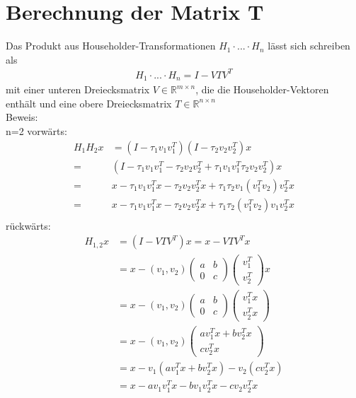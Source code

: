 \section{Berechnung der Matrix T}
Das Produkt aus Householder-Transformationen $H_1 \cdot ... \cdot H_n$ lässt sich schreiben als 
\begin{align*}
	H_1 \cdot ... \cdot H_n = I - VTV^T
\end{align*}
mit einer unteren Dreiecksmatrix $V \in \mathbb{R}^{m \times n}$, die die Householder-Vektoren enthält und eine obere Dreiecksmatrix $T \in \mathbb{R}^{n \times n}$ \cite{Joffrain:2006:AHT:1141885.1141886}\\
Beweis:\\
n=2
vorwärts: 
\begin{align*}
	H_1 H_2 x &= (I-\tau_1 v_1 v_1^T)(I-\tau_2 v_2 v_2^T)x\\
	= &(I - \tau_1 v_1 v_1^T - \tau_2 v_2 v_2^T +  \tau_1 v_1 v_1^T \tau_2 v_2 v_2^T )x\\
  = &x - \tau_1 v_1 v_1^T x - \tau_2 v_2 v_2^T x + \tau_1 \tau_2 v_1 (v_1^T v_2 )v_2^T x\\
  = &x - \tau_1 v_1 v_1^T x - \tau_2 v_2 v_2^T x + \tau_1 \tau_2 (v_1^T v_2 ) v_1 v_2^T x\\
\end{align*}
rückwärts:
\begin{align*}
H_{1,2} x &= (I - V T V^T) x = x - V T V^T x\\
&= x - (v_1, v_2)
\begin{pmatrix}
a & b \\ 0 & c
\end{pmatrix}
\begin{pmatrix}
v_1^T \\ v_2^T 
\end{pmatrix}
x\\
&= x - (v_1, v_2)
\begin{pmatrix}
a & b \\ 0 & c
\end{pmatrix}
\begin{pmatrix}
v_1^T x \\ v_2^T x
\end{pmatrix}\\
&= x - (v_1, v_2)
\begin{pmatrix}
a v_1^T x + b v_2^T x\\  c v_2^T x
\end{pmatrix}\\
&= x - v_1(a v_1^T x + b v_2^T x) - v_2 (c v_2^T x)\\
&= x - a v_1 v_1^T x - b v_1 v_2^T x - c v_2 v_2^T x
\end{align*}
